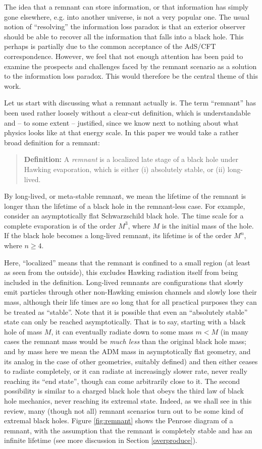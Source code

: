 \documentclass[12pt]{article}
\newcommand{\2}{$^2$}
\newcommand{\3}{$^3$}
\newcommand{\4}{$_4$}
\newcommand{\5}{$_5$}
\begin{document}
The idea that a remnant can store information, or that information has simply gone elsewhere, e.g. into another universe, is not a very popular one. The usual notion of ``resolving'' the information loss paradox is that an exterior observer should be able to recover all the information that falls into a black hole. This perhaps is partially due to the common acceptance of the AdS/CFT correspondence. However, we feel that not enough attention has been paid to examine the prospects and challenges faced by the remnant scenario as a solution to the information loss paradox. This would therefore be the central theme of this work.

Let us start with discussing what a remnant actually is.
The term ``remnant'' has been used rather loosely without a clear-cut definition, which is understandable and -- to some extent -- justified, since we know next to nothing about what physics looks like at that energy scale. In this paper we would take a rather broad definition for a remnant: 
\begin{quote}
\textbf{Definition:} A \emph{remnant} is a localized late stage of a black hole under Hawking evaporation, which is either (i) absolutely stable, or (ii) long-lived.
\end{quote}
By long-lived, or meta-stable remnant, we mean the lifetime of the remnant is longer than the lifetime of a black hole in the remnant-less case. For example, consider an asymptotically flat Schwarzschild black hole. 
The time scale for a complete evaporation is of the order $M^3$, where $M$ is the initial mass of the hole. If the black hole becomes a long-lived remnant, its lifetime is of the order $M^n$, where $n \geqslant 4$.

Here, ``localized'' means that the remnant is confined to a small region (at least as seen from the outside), this excludes Hawking radiation itself from being included in the definition.
Long-lived remnants are configurations that slowly emit particles through other non-Hawking emission channels and slowly lose their mass, although their life times are so long that for all practical purposes they can be treated as ``stable''.
Note that it is possible that even an ``absolutely stable'' state can only be reached asymptotically. 
That is to say, starting with a black hole of mass $M$, it can eventually radiate down to some mass $m < M$ (in many cases the remnant mass would be \emph{much less} than the original black hole mass; and by mass here we mean the ADM mass in asymptotically flat geometry, and its analog in the case of other geometries, suitably defined) and then either ceases to radiate completely, or it can radiate at increasingly slower rate, never really reaching its ``end state'', though can come arbitrarily close to it. The second possibility is similar to a charged black hole that obeys the third law of black hole mechanics, never reaching its extremal state. Indeed, as we shall see in this review, many (though not all) remnant scenarios turn out to be some kind of extremal black holes. Figure \ref{fig:remnant} shows the Penrose diagram of a remnant, with the assumption that the remnant is completely stable and has an infinite lifetime (see more discussion in Section \ref{overproduce}).
\end{document}
